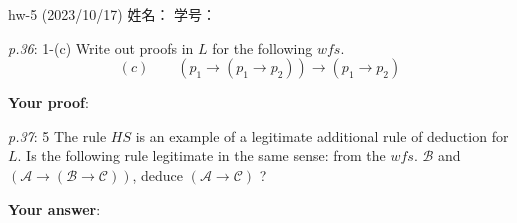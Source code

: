 \documentclass[UTF8,12pt,a4paper]{ctexart}
\begin{document}
	

\begin{center}
hw-5 (2023/10/17) \qquad\qquad 姓名：  \hspace{7em}  学号： 
\end{center}

\emph{p.36}: 1-(c) \quad
Write out proofs in $L$ for the following $wfs$.
\[
(c) \qquad  (p_1 \to (p_1 \to p_2)) \to (p_1 \to p_2)
\] 


\textbf{Your proof}:












\vspace{12cm}  %


\emph{p.37}: 5 \quad
The rule $HS$ is an example of a legitimate additional rule of deduction for $L$. Is the following rule legitimate in the same sense: from the $wfs.$ $\mathscr{B}$ and $(\mathscr{A} \to (\mathscr{B} \to \mathscr{C}))$, deduce $(\mathscr{A} \to \mathscr{C})$ ?


\textbf{Your answer}:





















\end{document}
